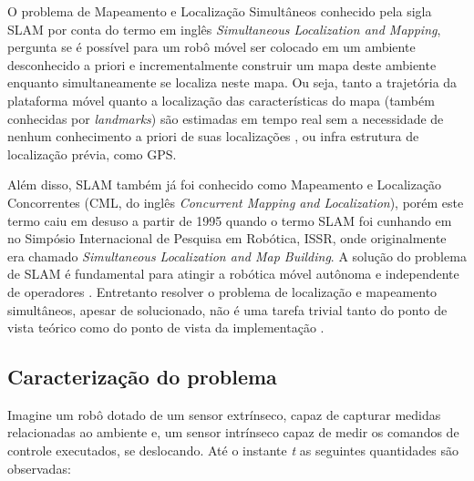 

O problema de Mapeamento e Localização Simultâneos conhecido pela sigla SLAM por conta do termo em inglês \textit{Simultaneous Localization and Mapping}, pergunta se é possível para um robô móvel ser colocado em um ambiente desconhecido a priori e incrementalmente construir um mapa deste ambiente enquanto simultaneamente se localiza neste mapa. Ou seja, tanto a trajetória da plataforma móvel quanto a localização das características do mapa (também conhecidas por \textit{landmarks}) são estimadas em tempo real sem a necessidade de nenhum conhecimento a priori de suas localizações \cite{durrant2006simultaneous}, ou infra estrutura de localização prévia, como GPS.

Além disso, SLAM também já foi conhecido como Mapeamento e Localização Concorrentes (CML, do inglês \textit{Concurrent Mapping and Localization}), porém este termo caiu em desuso a partir de 1995 quando o termo SLAM foi cunhando em \cite{durrant1996localization} no Simpósio Internacional de Pesquisa em Robótica, ISSR, onde originalmente era chamado \textit{Simultaneous Localization and Map Building}. A solução do problema de SLAM é fundamental para atingir a robótica móvel autônoma e independente de operadores \cite{durrant2006simultaneous}. Entretanto resolver o problema de localização e mapeamento simultâneos, apesar de solucionado, não é uma tarefa trivial tanto do ponto de vista teórico como do ponto de vista da implementação \cite{durrant1996localization}.

\subsection*{Caracterização do problema}
Imagine um robô dotado de um sensor extrínseco, capaz de capturar medidas relacionadas ao 
ambiente e, um sensor intrínseco capaz de medir os comandos de 
controle executados, se deslocando. Até o instante \emph{t} as seguintes 
quantidades são observadas:

